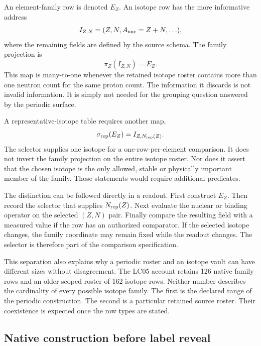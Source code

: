 An element-family row is denoted $E_Z$. An isotope row has the more informative address
\begin{equation}
I_{Z,N}=(Z,N,A_{\rm nuc}=Z+N,\ldots),
\end{equation}
where the remaining fields are defined by the source schema. The family projection is
\begin{equation}
\pi_Z(I_{Z,N})=E_Z.
\end{equation}
This map is many-to-one whenever the retained isotope roster contains more than one neutron count for the same proton count. The information it discards is not invalid information. It is simply not needed for the grouping question answered by the periodic surface.

A representative-isotope table requires another map,
\begin{equation}
\sigma_{\rm rep}(E_Z)=I_{Z,N_{\rm rep}(Z)}.
\end{equation}
The selector supplies one isotope for a one-row-per-element comparison. It does not invert the family projection on the entire isotope roster. Nor does it assert that the chosen isotope is the only allowed, stable or physically important member of the family. Those statements would require additional predicates.

The distinction can be followed directly in a readout. First construct $E_Z$. Then record the selector that supplies $N_{\rm rep}(Z)$. Next evaluate the nuclear or binding operator on the selected $(Z,N)$ pair. Finally compare the resulting field with a measured value if the row has an authorized comparator. If the selected isotope changes, the family coordinate may remain fixed while the readout changes. The selector is therefore part of the comparison specification.

This separation also explains why a periodic roster and an isotope vault can have different sizes without disagreement. The LC05 account retains 126 native family rows and an older scoped roster of 162 isotope rows. Neither number describes the cardinality of every possible isotope family. The first is the declared range of the periodic construction. The second is a particular retained source roster. Their coexistence is expected once the row types are stated.

\subsection{Native construction before label reveal}

